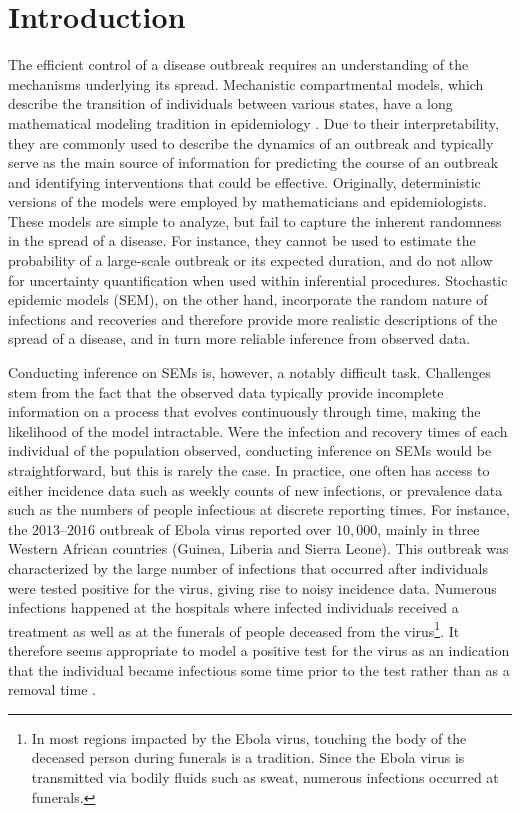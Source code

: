 \documentclass[11pt]{article}
\newcommand{\jx}[1]{{\color{blue}{ #1}}}
\begin{document}
	\section{Introduction}
	
	The efficient control of a disease outbreak requires an understanding of the mechanisms underlying its spread. Mechanistic compartmental models, which describe the transition of individuals between various states, have a long mathematical modeling tradition in epidemiology \cite{Kermack.1927}. Due to their interpretability, they are commonly used to describe the dynamics of an outbreak and typically serve as the main source of information for predicting the course of an outbreak and identifying interventions that could be effective. Originally, deterministic versions of the models were employed by mathematicians and epidemiologists. These models are simple to analyze, but fail to capture the inherent randomness in the spread of a disease. For instance, they cannot be used to estimate the probability of a large-scale outbreak or its expected duration, and do not allow for uncertainty quantification when used within inferential procedures. Stochastic epidemic models (SEM), on the other hand, incorporate the random nature of infections and recoveries and therefore provide more realistic descriptions of the spread of a disease, and in turn more reliable inference from observed data.
	
	Conducting inference on SEMs is, however, a notably difficult task. Challenges stem from the fact that the observed data typically provide incomplete information on a process that evolves continuously through time, making the likelihood of the model intractable. Were the infection and recovery times of each individual of the population observed, conducting inference on SEMs would be straightforward, but this is rarely the case. In practice, one often has access to either incidence data such as weekly counts of new infections, or prevalence data such as the numbers of people infectious at discrete reporting times. For instance, the $2013$–$2016$ outbreak of Ebola virus reported over $10,000$, mainly in three Western African countries (Guinea, Liberia and Sierra Leone). This outbreak was characterized by the large number of infections that occurred after individuals were tested positive for the virus, giving rise to noisy incidence data. Numerous infections happened at the hospitals where infected individuals received a treatment as well as at the funerals of people deceased from the virus\footnote{In most regions impacted by the Ebola virus, touching the body of the deceased person during funerals is a tradition. Since the Ebola virus is transmitted via bodily fluids such as sweat, numerous infections occurred at funerals.}. 
	It therefore seems appropriate to model a positive test for the virus as an indication that the individual became infectious some time prior to the test rather than as a removal time \jx{to do: stronger transition tying back to goal of partial observed inference}. 
	
\end{document}
